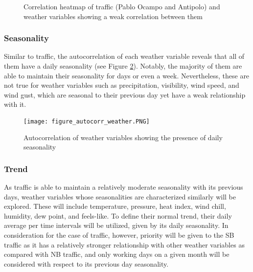 \begin{figure}[h]
  \centering
  \captionsetup{justification=centering}
  \caption{Correlation heatmap of traffic (Pablo Ocampo and Antipolo) and weather variables showing a weak correlation between them}
\label{figure_corr_trafficweather}
\end{figure}



\subsubsection{Seasonality}

Similar to traffic, the autocorrelation of each weather variable reveals that all of them have a daily seasonality (see Figure \ref{figure_autocorr_weather}). Notably, the majority of them are able to maintain their seasonality for days or even a week. Nevertheless, these are not true for weather variables such as precipitation, visibility, wind speed, and wind gust, which are seasonal to their previous day yet have a weak relationship with it.


\begin{figure}[h]
  \centering
  \captionsetup{justification=centering}
  \texttt{[image: figure\_autocorr\_weather.PNG]}
  \caption{Autocorrelation of weather variables showing the presence of daily seasonality}
\label{figure_autocorr_weather}
\end{figure}


\subsubsection{Trend}

As traffic is able to maintain a relatively moderate seasonality with its previous days, weather variables whose seasonalities are characterized similarly will be explored. These will include temperature, pressure, heat index, wind chill, humidity, dew point, and feels-like. To define their normal trend, their daily average per time intervals will be utilized, given by its daily seasonality. In consideration for the case of traffic, however, priority will be given to the SB traffic as it has a relatively stronger relationship with other weather variables as compared with NB traffic, and only working days on a given month will be considered with respect to its previous day seasonality.

